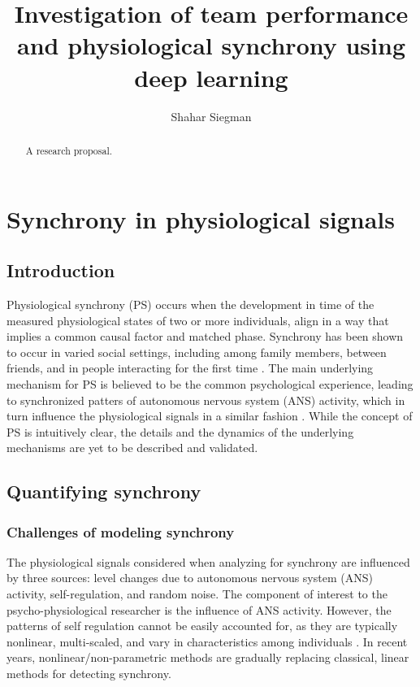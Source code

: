 \documentclass[a4paper, 11pt]{article}      %
\title{\LARGE \bf
Investigation of team performance 
and physiological synchrony
using deep learning }
\author{Shahar Siegman}
\begin{document}
\maketitle
\thispagestyle{empty}
\pagestyle{empty}


\begin{abstract}

A research proposal.

\end{abstract}

\section{Synchrony in physiological signals}
\subsection{Introduction}
Physiological synchrony (PS) occurs when the development in time of the measured physiological states of two or more individuals, align in a way that implies a common causal factor and matched phase. Synchrony has been shown to occur in varied social settings, including among family members, between friends, and in people interacting for the first time \citep{palumbo2017interpersonal}. The main underlying mechanism for PS is believed to be the common psychological experience, leading to synchronized patters of autonomous nervous system (ANS) activity, which in turn influence the physiological signals in a similar fashion \citep{palumbo2017interpersonal}. While the concept of PS is intuitively clear, the details and the dynamics of the underlying mechanisms are yet to be described and validated. 


\subsection{Quantifying synchrony}
\subsubsection{Challenges of modeling synchrony}
The physiological signals considered when analyzing for synchrony are influenced by three sources: level changes due to autonomous nervous system (ANS) activity, self-regulation, and random noise. The component of interest to the psycho-physiological researcher is the influence of ANS activity. However, the patterns of self regulation cannot be easily accounted for, as they are typically nonlinear, multi-scaled, and vary in characteristics among individuals \citep{ivanov20011}. In recent years, 
nonlinear/non-parametric methods are gradually replacing classical, linear methods for detecting synchrony.
\end{document}
